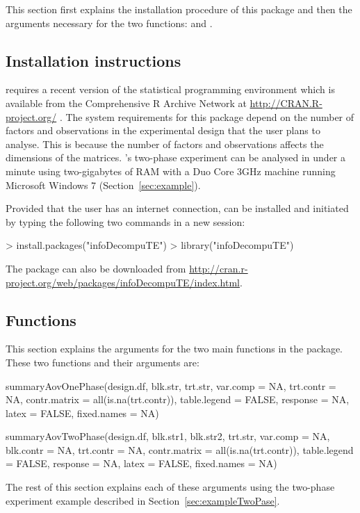 \documentclass[article]{jss}
\begin{document}
This section first explains the installation procedure of this package and then the arguments necessary for the two functions:  and .

\subsection{Installation instructions}
 requires a recent version of the  statistical programming environment which is available from the Comprehensive R Archive Network at \url{http://CRAN.R-project.org/} \citep{R2012}. The system requirements for this package depend on the number of factors and observations in the experimental design that the user plans to analyse. This is because the number of factors and observations affects the dimensions of the matrices. \citeauthor{Brien1999}'s \citeyearpar{Brien1999} two-phase experiment can be analysed in under a minute using two-gigabytes of RAM with a Duo Core 3GHz machine running Microsoft Windows 7 (Section~\ref{sec:example}).

Provided that the user has an internet connection,  can be installed and initiated by typing the following two commands in a new  session: 
\begin{CodeChunk}
\begin{CodeInput}
> install.packages("infoDecompuTE")
> library("infoDecompuTE")
\end{CodeInput}
\end{CodeChunk}
The package can also be downloaded from \url{http://cran.r-project.org/web/packages/infoDecompuTE/index.html}.


\subsection{Functions}
This section explains the arguments for the two main functions in the  package. These two functions and their arguments are:
\begin{CodeChunk}
\begin{CodeInput}
summaryAovOnePhase(design.df, blk.str, trt.str, var.comp = NA,
                trt.contr = NA, contr.matrix = all(is.na(trt.contr)),
                table.legend = FALSE, response = NA, latex = FALSE,
                fixed.names = NA)
                
summaryAovTwoPhase(design.df, blk.str1, blk.str2, trt.str, var.comp = NA, 
                blk.contr = NA, trt.contr = NA, 
                contr.matrix = all(is.na(trt.contr)),  table.legend = FALSE,
                response = NA, latex = FALSE, fixed.names = NA)
\end{CodeInput}
\end{CodeChunk}
The rest of this section explains each of these arguments using the two-phase experiment example described in Section~\ref{sec:exampleTwoPase}.
\end{document}

